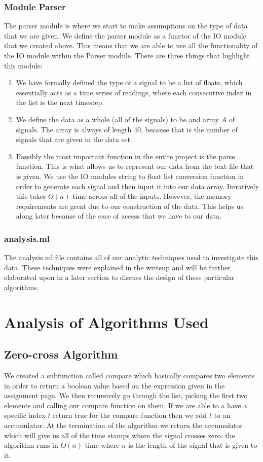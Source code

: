 \documentclass[11pt]{article} %
\begin{document}
\subsubsection{Module Parser}
The parser module is where we start to make assumptions on the type of data that we are given. We define the parser module as a functor of the IO module that we created above. This means that we are able to use all the functionality of the IO module within the Parser module. There are three things that highlight this module: 
\begin{enumerate}
\item We have formally defined the type of a signal to be a list of floats, which essentially acts as a time series of readings, where each consecutive index in the list is the next timestep. 

\item We define the data as a whole (all of the signals) to be and array $A$ of signals. The array is always of length 40, because that is the number of signals that are given in the data set. 

\item Possibly the most important function in the entire project is the parse function. This is what allows us to represent our data from the text file that is given. We use the IO modules string to float list conversion function in order to generate each signal and then input it into our data array. Iteratively this takes $O(n)$ time across all of the inputs. However, the memory requirements are great due to our construction of the data. This helps us along later because of the ease of access that we have to our data.  
\end{enumerate}

\subsubsection{analysis.ml}
The analysis.ml file contains all of our analytic techniques used to investigate this data. These techniques were explained in the writeup and will be further elaborated upon in a later section to discuss the design of these particular algorithms.

\section{Analysis of Algorithms Used}

\subsection{Zero-cross Algorithm}
We created a subfunction called compare which basically compares two elements in order to return a boolean value based on the expression given in the assignment page. We then recursively go through the list, picking the first two elements and calling our compare function on them. If we are able to a have a specific index $t$ return true for the compare function then we add $t$ to an accumulator. At the termination of the algorithm we return the accumulator which will give us all of the time stamps where the signal crosses zero. the algorithm runs in $O(n)$ time where $n$ is the length of the signal that is given to it. 
\end{document}
